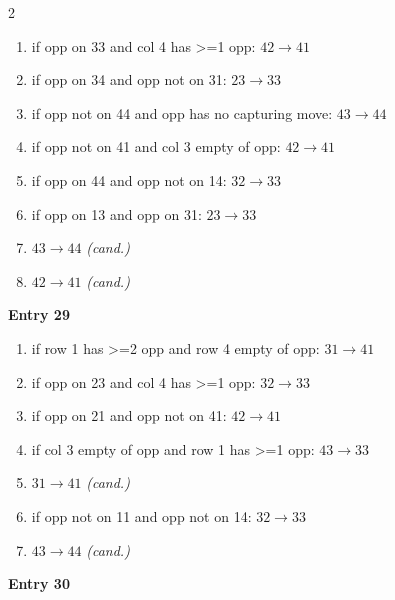 \begin{multicols}{2}
\begin{enumerate}[topsep=1pt,itemsep=0pt,parsep=0pt,leftmargin=2.2em,label=\arabic*.]
\item if opp on 33 and col 4 has >=1 opp: $42\!\to\!41$
\item if opp on 34 and opp not on 31: $23\!\to\!33$
\item if opp not on 44 and opp has no capturing move: $43\!\to\!44$
\item if opp not on 41 and col 3 empty of opp: $42\!\to\!41$
\item if opp on 44 and opp not on 14: $32\!\to\!33$
\item if opp on 13 and opp on 31: $23\!\to\!33$
\item $43\!\to\!44$ \hfill\textit{(cand.)}
\item $42\!\to\!41$ \hfill\textit{(cand.)}
\end{enumerate}\smallskip
\noindent\textbf{Entry 29} \; 
\nopagebreak\begin{enumerate}[topsep=1pt,itemsep=0pt,parsep=0pt,leftmargin=2.2em,label=\arabic*.]
\item if row 1 has >=2 opp and row 4 empty of opp: $31\!\to\!41$
\item if opp on 23 and col 4 has >=1 opp: $32\!\to\!33$
\item if opp on 21 and opp not on 41: $42\!\to\!41$
\item if col 3 empty of opp and row 1 has >=1 opp: $43\!\to\!33$
\item $31\!\to\!41$ \hfill\textit{(cand.)}
\item if opp not on 11 and opp not on 14: $32\!\to\!33$
\item $43\!\to\!44$ \hfill\textit{(cand.)}
\end{enumerate}\smallskip
\noindent\textbf{Entry 30} \; 
\end{multicols}
